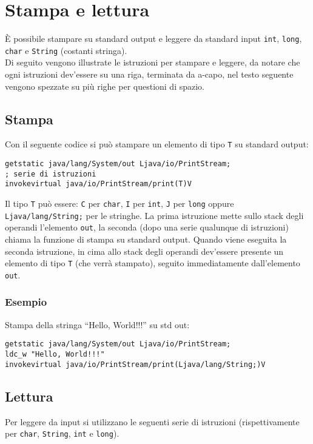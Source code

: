 \section{Stampa e lettura}
\label{sec:stampa_e_lettura}
\`E possibile stampare su standard output e leggere da standard input \texttt{int}, \texttt{long}, \texttt{char} e \texttt{String} (costanti stringa).\\
Di seguito vengono illustrate le istruzioni per stampare e leggere, da notare che ogni istruzioni dev'essere su una riga, terminata da a-capo, nel testo seguente vengono spezzate su pi\`u righe per questioni di spazio.

\subsection{Stampa}
\label{sec:stampa}
Con il seguente codice si pu\`o stampare un elemento di tipo \texttt{T} su standard output:
\begin{verbatim}
getstatic java/lang/System/out Ljava/io/PrintStream;
; serie di istruzioni
invokevirtual java/io/PrintStream/print(T)V
\end{verbatim}
Il tipo \texttt{T} pu\`o essere: \texttt{C} per \texttt{char}, \texttt{I} per \texttt{int}, \texttt{J} per \texttt{long} oppure \texttt{Ljava/lang/String;} per le stringhe. La prima istruzione mette sullo stack degli operandi l'elemento \texttt{out}, la seconda (dopo una serie qualunque di istruzioni) chiama la funzione di stampa su standard output. Quando viene eseguita la seconda istruzione, in cima allo stack degli operandi dev'essere presente un elemento di tipo \texttt{T} (che verr\`a stampato), seguito immediatamente dall'elemento \texttt{out}.

\subsubsection*{Esempio}
Stampa della stringa ``Hello, World!!!'' su std out:
\begin{verbatim}
getstatic java/lang/System/out Ljava/io/PrintStream;
ldc_w "Hello, World!!!"
invokevirtual java/io/PrintStream/print(Ljava/lang/String;)V
\end{verbatim}


\subsection{Lettura}
\label{sec:lettura}
Per leggere da input si utilizzano le seguenti serie di istruzioni (rispettivamente per \texttt{char}, \texttt{String}, \texttt{int} e \texttt{long}).


